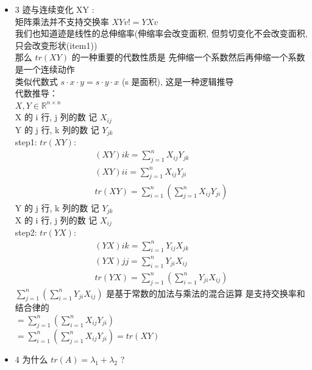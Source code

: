 \documentclass[12pt]{article}
\begin{document}
\begin{flushleft}
\begin{itemize}
              有 2.1.1和 2.1.2 我们得知 B 和 A 是同一种线性变换 T 的 两种表达
              对 $tr(T) = tr(A) = tr(B)$ 迹在不同基底的不变性
        \item 3 迹与连续变化 XY : \\
              矩阵乘法并不支持交换率 $XYv != YXv$  \\
              我们也知道迹是线性的总伸缩率(伸缩率会改变面积, 但剪切变化不会改变面积, 只会改变形状(item1)) \\
              那么 $tr(XY)$ 的一种重要的代数性质是 先伸缩一个系数然后再伸缩一个系数 是一个连续动作 \\
              类似代数式 $s \cdot x \cdot y = s \cdot y  \cdot x$ (s 是面积), 这是一种逻辑推导 \\
              代数推导： \\
              $X,Y \in \mathbb{R}^{n \times n}$ \\
              X 的 i 行, j 列的数 记 $X_{ij}$ \\
              Y 的 j 行, k 列的数 记 $Y_{jk}$ \\
              step1: $tr(XY):$
              \begin{align}
                  (XY)ik = \sum_{j = 1}^{n} X_{ij}Y_{jk} \\
                  (XY)ii = \sum_{j = 1}^{n} X_{ij}Y_{ji} \\
                  tr(XY) = \sum_{i = 1}^{n}(\sum_{j = 1}^{n} X_{ij}Y_{ji})
              \end{align}
              Y 的 j 行, k 列的数 记 $Y_{jk}$ \\
              X 的 i 行, j 列的数 记 $X_{ij}$ \\
              step2: $tr(YX):$
              \begin{align}
                  (YX)ik = \sum_{i = 1}^{n} Y_{ij}X_{jk} \\
                  (YX)jj = \sum_{i = 1}^{n} Y_{ji}X_{ij} \\
                  tr(YX) = \sum_{j = 1}^{n}(\sum_{i = 1}^{n} Y_{ji}X_{ij})
              \end{align}
              $\sum_{j = 1}^{n}(\sum_{i = 1}^{n} Y_{ji}X_{ij})$ 是基于常数的加法与乘法的混合运算 是支持交换率和结合律的 \\
              $ = \sum_{j = 1}^{n}(\sum_{i = 1}^{n} X_{ij} Y_{ji})$ \\
              $ = \sum_{i = 1}^{n}(\sum_{j = 1}^{n} X_{ij} Y_{ji}) = tr(XY)$ \\
        \item 4 为什么 $tr(A) = \lambda_{1} + \lambda_{2}$ ? \\

\end{itemize}
\end{flushleft}
\end{document}

